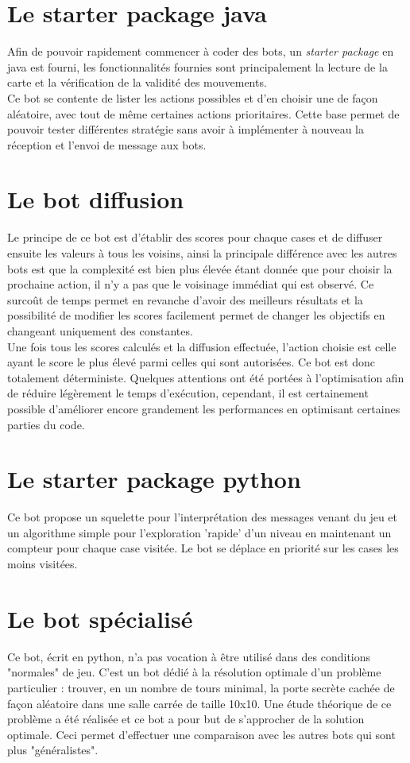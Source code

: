 \documentclass[10pt,a4paper]{report}
\begin{document}
\section{Le starter package java}
Afin de pouvoir rapidement commencer à coder des bots, un \emph{starter package}
en java est fourni, les fonctionnalités fournies sont principalement la lecture
de la carte et la vérification de la validité des mouvements.
\\
Ce bot se contente de lister les actions possibles et d'en choisir une de façon
aléatoire, avec tout de même certaines actions prioritaires. Cette base permet
de pouvoir tester différentes stratégie sans avoir à implémenter à nouveau la
réception et l'envoi de message aux bots.

\section{Le bot diffusion}
Le principe de ce bot est d'établir des scores pour chaque cases et de diffuser
ensuite les valeurs à tous les voisins, ainsi la principale différence avec les
autres bots est que la complexité est bien plus élevée étant donnée que pour
choisir la prochaine action, il n'y a pas que le voisinage immédiat qui est
observé. Ce surcoût de temps permet en revanche d'avoir des meilleurs résultats
et la possibilité de modifier les scores facilement permet de changer les
objectifs en changeant uniquement des constantes.
\\
Une fois tous les scores calculés et la diffusion effectuée, l'action choisie
est celle ayant le score le plus élevé parmi celles qui sont autorisées. Ce bot
est donc totalement déterministe. Quelques attentions ont été portées à
l'optimisation afin de réduire légèrement le temps d'exécution, cependant, il
est certainement possible d'améliorer encore grandement les performances en
optimisant certaines parties du code.

\section{Le starter package python}

Ce bot propose un squelette pour l'interprétation des messages venant du jeu et un algorithme simple pour l'exploration 'rapide' d'un niveau en maintenant un compteur pour chaque case visitée. Le bot se déplace en priorité sur les cases les moins visitées.

\section{Le bot spécialisé}
Ce bot, écrit en python, n'a pas vocation à être utilisé dans des conditions
"normales" de jeu. C'est un bot dédié à la résolution optimale d'un problème
particulier : trouver, en un nombre de tours minimal, la porte secrète cachée
de façon aléatoire dans une salle carrée de taille 10x10. Une étude théorique
de ce problème a été réalisée et ce bot a pour but de s'approcher de la
solution optimale. Ceci permet d'effectuer une comparaison avec les autres
bots qui sont plus "généralistes".
\end{document}
